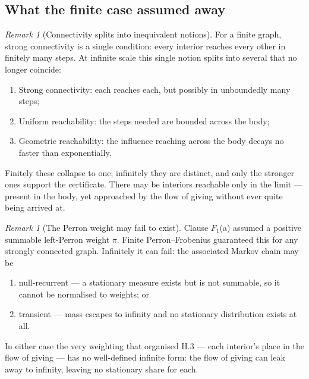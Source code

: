 \documentclass[11pt,a4paper]{article}
\def\mathfrak#1{#1}%
\def\emph#1{#1}%
\theoremstyle{definition}
\theoremstyle{plain}
\theoremstyle{remark}
\newtheorem{remark}[definition]{Remark}
\begin{document}
\subsection{What the finite case assumed away}

\begin{remark}[Connectivity splits into inequivalent notions]\label{rem:connsplit}
For a finite graph, strong connectivity is a single condition: every interior reaches every
other in finitely many steps. At infinite scale this single notion splits into several that no
longer coincide:
\begin{enumerate}[label=\textup{(\alph*)},leftmargin=1.2cm]
\item \emph{Strong connectivity:} each reaches each, but possibly in unboundedly many steps;
\item \emph{Uniform reachability:} the steps needed are bounded across the body;
\item \emph{Geometric reachability:} the influence reaching across the body decays no faster
than exponentially.
\end{enumerate}
Finitely these collapse to one; infinitely they are distinct, and only the stronger ones support
the certificate. There may be interiors reachable only in the limit --- present in the body, yet
approached by the flow of giving without ever quite being arrived at.
\end{remark}

\begin{remark}[The Perron weight may fail to exist]\label{rem:perronfail}
Clause \(\mathfrak F_1\)(a) assumed a positive summable left-Perron weight \(\pi\). Finite
Perron--Frobenius \emph{guaranteed} this for any strongly connected graph. Infinitely it can
fail: the associated Markov chain may be
\begin{enumerate}[label=\textup{(\alph*)},leftmargin=1.2cm]
\item \emph{null-recurrent} --- a stationary measure exists but is not summable, so it cannot be
normalised to weights; or
\item \emph{transient} --- mass escapes to infinity and no stationary distribution exists at
all.
\end{enumerate}
In either case the very weighting that organised H.3 --- each interior's place in the flow of
giving --- has no well-defined infinite form: the flow of giving can leak away to infinity,
leaving no stationary share for each.
\end{remark}
\end{document}
